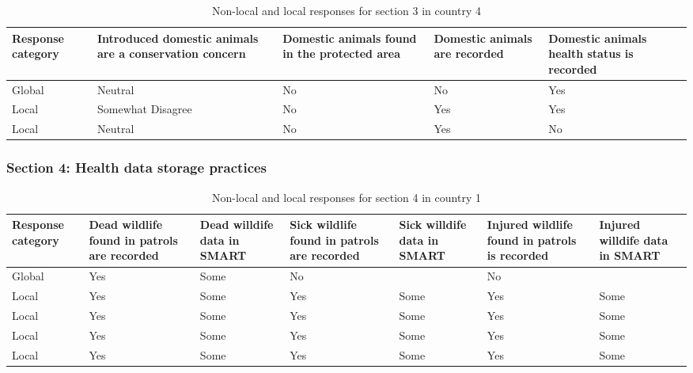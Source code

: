 \documentclass[
  letterpaper,
  DIV=11,
  numbers=noendperiod]{scrartcl}
\begin{document}
\begin{table}[H]

\caption{Non-local and local responses for section 3 in country 4}
\centering
\begin{tabular}[t]{>{\raggedright\arraybackslash}p{2cm}|>{\raggedright\arraybackslash}p{3cm}|>{\raggedright\arraybackslash}p{2cm}|>{\raggedright\arraybackslash}p{2cm}|>{\raggedright\arraybackslash}p{2cm}}
\hline
Response
category & Introduced domestic
animals are
a conservation
concern & Domestic animals
found in the
protected area & Domestic animals
are recorded & Domestic animals
health status
is recorded\\
\hline
Global & Neutral & No & No & Yes\\
\hline
Local & Somewhat Disagree & No & Yes & Yes\\
\hline
Local & Neutral & No & Yes & No\\
\hline
\end{tabular}
\end{table}

\hypertarget{section-4-health-data-storage-practices-1}{%
\subsubsection{Section 4: Health data storage
practices}\label{section-4-health-data-storage-practices-1}}

\begin{table}[H]

\caption{Non-local and local responses for section 4 in country 1}
\centering
\begin{tabular}[t]{>{\raggedright\arraybackslash}p{2cm}|>{\raggedright\arraybackslash}p{2cm}|>{\raggedright\arraybackslash}p{2cm}|>{\raggedright\arraybackslash}p{2cm}|>{\raggedright\arraybackslash}p{2cm}|>{\raggedright\arraybackslash}p{2cm}|>{\raggedright\arraybackslash}p{2cm}}
\hline
Response
category & Dead wildlife
found in patrols
are recorded & Dead willdife
data in SMART & Sick wildlife
found in patrols
are recorded & Sick willdife
data in SMART & Injured wildlife
found in patrols
is recorded & Injured willdife
data in SMART\\
\hline
Global & Yes & Some & No &  & No & \\
\hline
Local & Yes & Some & Yes & Some & Yes & \vphantom{3} Some\\
\hline
Local & Yes & Some & Yes & Some & Yes & \vphantom{2} Some\\
\hline
Local & Yes & Some & Yes & Some & Yes & \vphantom{1} Some\\
\hline
Local & Yes & Some & Yes & Some & Yes & Some\\
\hline
\end{tabular}
\end{table}
\end{document}
